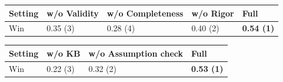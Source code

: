 \documentclass{article}
\begin{document}
\begin{table}[t!]
    \vspace{0mm}
\begin{minipage}{0.48\textwidth}
    \centering
    \label{tab:ablation-proof}
    \vspace{-2mm}
    \begin{tabular}{x{40pt}| x{35pt} x{38pt} x{38pt} x{38pt}}\toprule
    Setting 
    & w/o Validity 
    & w/o Completeness 
    & w/o Rigor 
    &  Full \\\midrule
    Win 
    & 0.35 (3) 
    & 0.28 (4) 
    & 0.40 (2) 
    &  \textbf{0.54 (1)} \\
    \bottomrule
    \end{tabular}
\end{minipage}
    \hspace{1.5mm}
\begin{minipage}{0.48\textwidth}
    \centering
    \vspace{-2mm}
    \begin{tabular}{x{45pt}| x{38pt} x{58pt} x{38pt}}\toprule
    Setting 
    & w/o KB 
    & w/o Assumption check 
    &  Full \\\midrule
    Win 
    & 0.22 (3) 
    & 0.32 (2) 
    &  \textbf{0.53 (1)} \\
    \bottomrule
    \end{tabular}
\end{minipage}\\


\end{table}
\end{document}
